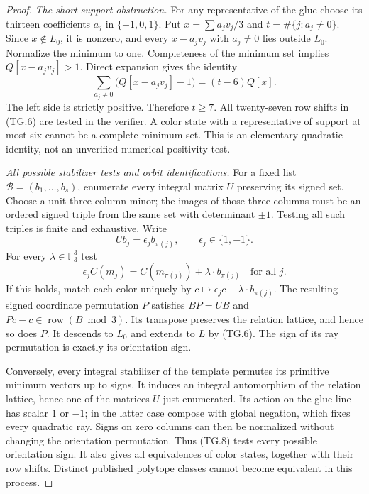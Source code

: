 \begin{proof}
\emph{The short-support obstruction.}
For any representative of the glue choose its thirteen coefficients
$a_j$ in $\{-1,0,1\}$. Put
$x=\sum a_jv_j/3$ and $t=\#\{j:a_j\ne0\}$.
Since $x\notin L_0$, it is nonzero, and every $x-a_jv_j$ with
$a_j\ne0$ lies outside $L_0$. Normalize the minimum to one.
Completeness of the minimum set implies $Q[x-a_jv_j]>1$.
Direct expansion gives the identity
\[
 \sum_{a_j\ne0}\bigl(Q[x-a_jv_j]-1\bigr)
       =(t-6)Q[x].                                             \tag{TG.7}
\]
The left side is strictly positive. Therefore $t\ge7$.
All twenty-seven row shifts in (TG.6) are tested in the verifier.
A color state with a representative of support at most six cannot
be a complete minimum set. This is an elementary quadratic identity,
not an unverified numerical positivity test.

\emph{All possible stabilizer tests and orbit identifications.}
For a fixed list $\mathcal B=(b_1,\ldots,b_s)$, enumerate every integral
matrix $U$ preserving its signed set. Choose a unit three-column minor;
the images of those three columns must be an ordered signed triple
from the same set with determinant $\pm1$. Testing all such triples
is finite and exhaustive. Write
\[
 Ub_j=\epsilon_j b_{\pi(j)},\qquad\epsilon_j\in\{1,-1\}.
\]
For every $\lambda\in\mathbb F_3^3$ test
\[
 \epsilon_j C(m_j)
     = C(m_{\pi(j)})+\lambda\mathbin{\cdot}b_{\pi(j)}
       \quad\text{for all }j.                                 \tag{TG.8}
\]
If this holds, match each color uniquely by
$c\mapsto\epsilon_jc-\lambda\cdot b_{\pi(j)}$.
The resulting signed coordinate permutation $P$ satisfies
$BP=UB$ and $Pc-c\in\operatorname{row}(B\bmod3)$.
Its transpose preserves the relation lattice, and hence so does $P$.
It descends to $L_0$ and extends to $L$ by (TG.6).
The sign of its ray permutation is exactly its orientation sign.

Conversely, every integral stabilizer of the template permutes its
primitive minimum vectors up to signs. It induces an integral
automorphism of the relation lattice, hence one of the matrices $U$
just enumerated. Its action on the glue line has scalar $1$ or $-1$;
in the latter case compose with global negation, which fixes every
quadratic ray. Signs on zero columns can then be normalized without
changing the orientation permutation. Thus (TG.8) tests every
possible orientation sign. It also gives all equivalences of color
states, together with their row shifts. Distinct published polytope
classes cannot become equivalent in this process.


\end{proof}
